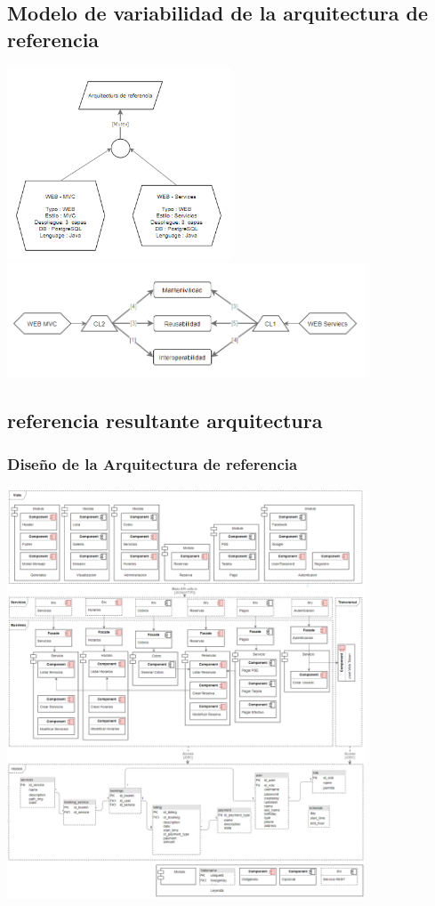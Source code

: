 \documentclass[10pt,a4paper,openany]{book}
\begin{document}
\subsection{Modelo de variabilidad de la arquitectura de referencia}
\begin{center}
\includegraphics[width=0.5\textwidth]{model1}\\
\includegraphics[width=0.8\textwidth]{model2}
\end{center}

\subsection{referencia resultante arquitectura}
\subsubsection{Diseño de la Arquitectura de referencia}
\begin{center}
\includegraphics[width=0.8\textwidth]{arq3}
\end{center}
\end{document}

